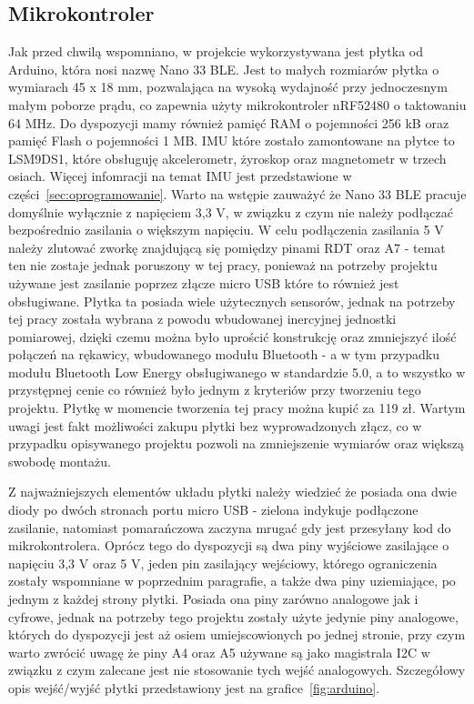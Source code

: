 	
	\subsection{Mikrokontroler}
	\label{subsec:arduino}
	Jak przed chwilą wspomniano, w projekcie wykorzystywana jest płytka od Arduino, która nosi nazwę Nano 33 BLE. Jest to małych rozmiarów płytka o  wymiarach 45 x 18 mm, pozwalająca na wysoką wydajność przy jednoczesnym małym poborze prądu, co zapewnia użyty mikrokontroler nRF52480 o taktowaniu 64 MHz. Do dyspozycji mamy również pamięć RAM o pojemności 256 kB oraz pamięć Flash o pojemności 1 MB. IMU które zostało zamontowane na płytce to LSM9DS1, które obsługuję akcelerometr, żyroskop oraz magnetometr w trzech osiach. Więcej infomracji na temat IMU jest przedstawione w części~\ref{sec:oprogramowanie}. Warto na wstępie zauważyć że Nano 33 BLE pracuje domyślnie wyłącznie z napięciem 3,3 V, w związku z czym nie należy podłączać bezpośrednio zasilania o większym napięciu. W celu podłączenia zasilania 5 V należy zlutować zworkę znajdującą się pomiędzy pinami RDT oraz A7 - temat ten nie zostaje jednak poruszony w tej pracy, ponieważ na potrzeby projektu używane jest zasilanie poprzez złącze micro USB które to również jest obsługiwane. Płytka ta posiada wiele użytecznych sensorów, jednak na potrzeby tej pracy została wybrana z powodu wbudowanej inercyjnej jednostki pomiarowej, dzięki czemu można było uprościć konstrukcję   oraz zmniejszyć ilość połączeń na rękawicy, wbudowanego modułu Bluetooth - a w tym przypadku modułu Bluetooth Low Energy obsługiwanego w standardzie 5.0, a to wszystko w przystępnej cenie co również było jednym z kryteriów przy tworzeniu tego projektu. Płytkę w momencie tworzenia tej pracy można kupić za 119 zł. Wartym uwagi jest fakt możliwości zakupu płytki bez wyprowadzonych złącz, co w przypadku opisywanego projektu pozwoli na zmniejszenie wymiarów oraz większą swobodę montażu.~\cite{botland-arduino}
	
	Z najważniejszych elementów układu płytki należy wiedzieć że posiada ona dwie diody po dwóch stronach portu micro USB - zielona indykuje podłączone zasilanie, natomiast pomarańczowa zaczyna mrugać gdy jest przesyłany kod do mikrokontrolera. Oprócz tego do dyspozycji są dwa piny wyjściowe zasilające o napięciu 3,3 V oraz 5 V, jeden pin zasilający wejściowy, którego ograniczenia zostały wspomniane w poprzednim paragrafie, a także dwa piny uziemiające, po jednym z każdej strony płytki. Posiada ona piny zarówno analogowe jak i cyfrowe, jednak na potrzeby tego projektu zostały użyte jedynie piny analogowe, których do dyspozycji jest aż osiem umiejscowionych po jednej stronie, przy czym warto zwrócić uwagę że piny A4 oraz A5 używane są jako magistrala I2C w związku z czym zalecane jest nie stosowanie tych wejść analogowych. Szczegółowy opis wejść/wyjść płytki przedstawiony jest na grafice~\ref{fig:arduino}.
	
